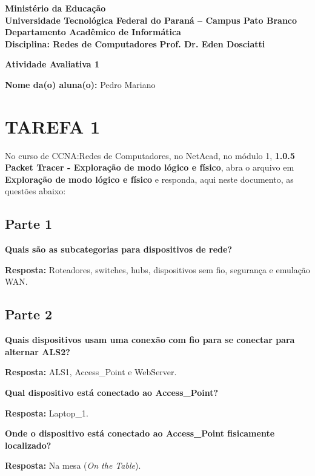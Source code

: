 \documentclass[12pt,a4paper]{article}
\newcommand{\resposta}[1]{\textbf{Resposta:} #1}
\begin{document}
\begin{center}
\textbf{Ministério da Educação}\\
\textbf{Universidade Tecnológica Federal do Paraná -- Campus Pato Branco}\\
\textbf{Departamento Acadêmico de Informática}\\[0.5em]
\textbf{Disciplina: Redes de Computadores} \hfill \textbf{Prof. Dr. Eden Dosciatti}

\vspace{1.2em}
\Large\textbf{Atividade Avaliativa 1}
\end{center}

\vspace{1em}
\noindent\textbf{Nome da(o) aluna(o):} Pedro Mariano

\vspace{1.2em}
\section*{TAREFA 1}
No curso de CCNA:Redes de Computadores, no NetAcad, no módulo 1, \textbf{1.0.5 Packet Tracer - Exploração de modo lógico e físico}, abra o arquivo em \textbf{Exploração de modo lógico e físico} e responda, aqui neste documento, as questões abaixo:

\subsection*{Parte 1}
\noindent\textbf{Quais são as subcategorias para dispositivos de rede?}

\resposta{Roteadores, switches, hubs, dispositivos sem fio, segurança e emulação WAN.}

\subsection*{Parte 2}
\noindent\textbf{Quais dispositivos usam uma conexão com fio para se conectar para alternar ALS2?}

\resposta{ALS1, Access\_Point e WebServer.}

\vspace{0.8em}
\noindent\textbf{Qual dispositivo está conectado ao Access\_Point?}

\resposta{Laptop\_1.}

\vspace{0.8em}
\noindent\textbf{Onde o dispositivo está conectado ao Access\_Point fisicamente localizado?}

\resposta{Na mesa (\textit{On the Table}).}
\end{document}
